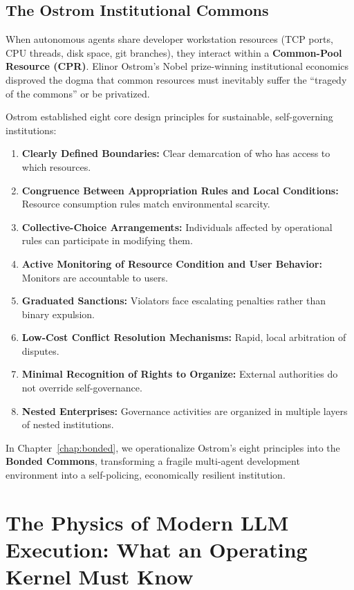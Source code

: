 \subsection{The Ostrom Institutional Commons}

When autonomous agents share developer workstation resources (TCP ports, CPU threads, disk space, git branches), they interact within a \textbf{Common-Pool Resource (CPR)}. Elinor Ostrom's Nobel prize-winning institutional economics~ disproved the dogma that common resources must inevitably suffer the ``tragedy of the commons'' or be privatized.

Ostrom established eight core design principles for sustainable, self-governing institutions:
\begin{enumerate}[leftmargin=1.8em,itemsep=2pt]
  \item \textbf{Clearly Defined Boundaries:} Clear demarcation of who has access to which resources.
  \item \textbf{Congruence Between Appropriation Rules and Local Conditions:} Resource consumption rules match environmental scarcity.
  \item \textbf{Collective-Choice Arrangements:} Individuals affected by operational rules can participate in modifying them.
  \item \textbf{Active Monitoring of Resource Condition and User Behavior:} Monitors are accountable to users.
  \item \textbf{Graduated Sanctions:} Violators face escalating penalties rather than binary expulsion.
  \item \textbf{Low-Cost Conflict Resolution Mechanisms:} Rapid, local arbitration of disputes.
  \item \textbf{Minimal Recognition of Rights to Organize:} External authorities do not override self-governance.
  \item \textbf{Nested Enterprises:} Governance activities are organized in multiple layers of nested institutions.
\end{enumerate}

In Chapter~\ref{chap:bonded}, we operationalize Ostrom's eight principles into the \textbf{Bonded Commons}, transforming a fragile multi-agent development environment into a self-policing, economically resilient institution.

\section{The Physics of Modern LLM Execution: What an Operating Kernel Must Know}\label{sec:prereq-llm-physics}

